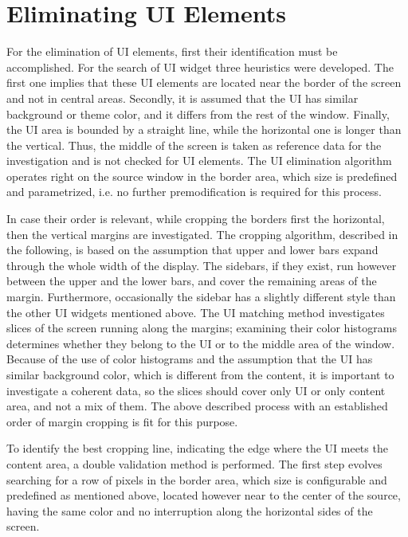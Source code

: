 \documentclass[draft,final]{vutinfth} %
\begin{document}
	\section{Eliminating UI Elements}
	For the elimination of UI elements, first their identification must be accomplished. 
	For the search of UI widget three heuristics were developed.
	The first one implies that these UI elements are located near the border of the screen and not in central areas.
	Secondly, it is assumed that the UI has similar background or theme color, and it differs from the rest of the window.
	Finally, the UI area is bounded by a straight line, while the horizontal one is longer than the vertical.
	Thus, the middle of the screen is taken as reference data for the investigation and is not checked for UI elements.
	The UI elimination algorithm operates right on the source window in the border area, which size is predefined and parametrized, i.e. no further premodification is required for this process.\par
	In case their order is relevant, while cropping the borders first the horizontal, then the vertical margins are investigated.
	The cropping algorithm, described in the following, is based on the assumption that upper and lower bars expand through the whole width of the display.
	The sidebars, if they exist, run however between the upper and the lower bars, and cover the remaining areas of the margin.
	Furthermore, occasionally the sidebar has a slightly different style than the other UI widgets mentioned above.
	The UI matching method investigates slices of the screen running along the margins; examining their color histograms determines whether they belong to the UI or to the middle area of the window.
	Because of the use of color histograms and the assumption that the UI has similar background color, which is different from the content, it is important to investigate a coherent data, so the slices should cover only UI or only content area, and not a mix of them.
	The above described process with an established order of margin cropping is fit for this purpose. \par 
	To identify the best cropping line, indicating the edge where the UI meets the content area, a double validation method is performed.
	The first step evolves searching for a row of pixels in the border area, which size is configurable and predefined as mentioned above, located however near to the center of the source, having the same color and no interruption along the horizontal sides of the screen.
\end{document}
